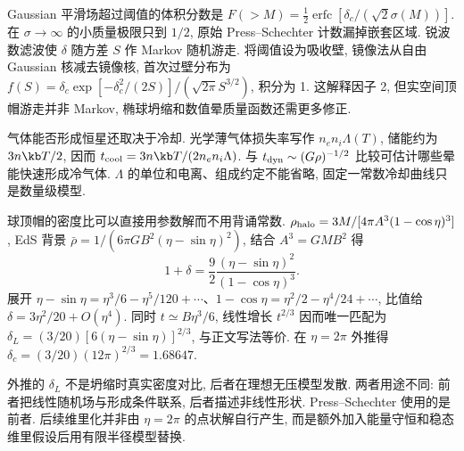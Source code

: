 Gaussian 平滑场超过阈值的体积分数是 $F(>M)=\frac12\operatorname{erfc}[\delta_c/(\sqrt2\sigma(M))]$. 在 $\sigma\to\infty$ 的小质量极限只到 $1/2$, 原始 Press--Schechter 计数漏掉嵌套区域. 锐波数滤波使 $\delta$ 随方差 $S$ 作 Markov 随机游走. 将阈值设为吸收壁, 镜像法从自由 Gaussian 核减去镜像核, 首次过壁分布为 $f(S)=\delta_c\exp[-\delta_c^2/(2S)]/(\sqrt{2\pi}S^{3/2})$, 积分为 1. 这解释因子 2, 但实空间顶帽游走并非 Markov, 椭球坍缩和数值晕质量函数还需更多修正.

气体能否形成恒星还取决于冷却. 光学薄气体损失率写作 $n_en_i\Lambda(T)$, 储能约为 $3n\kb T/2$, 因而 $t_{\rm cool}=3n\kb T/(2n_en_i\Lambda)$. 与 $t_{\rm dyn}\sim(G\rho)^{-1/2}$ 比较可估计哪些晕能快速形成冷气体. $\Lambda$ 的单位和电离、组成约定不能省略, 固定一常数冷却曲线只是数量级模型.

球顶帽的密度比可以直接用参数解而不用背诵常数. $\rho_{\rm halo}=3M/[4\pi A^3(1-\cos\eta)^3]$, EdS 背景 $\bar\rho=1/(6\pi GB^2(\eta-\sin\eta)^2)$, 结合 $A^3=GMB^2$ 得
\[
1+\delta=\frac92\frac{(\eta-\sin\eta)^2}{(1-\cos\eta)^3}.
\]
展开 $\eta-\sin\eta=\eta^3/6-\eta^5/120+\cdots$、$1-\cos\eta=\eta^2/2-\eta^4/24+\cdots$, 比值给 $\delta=3\eta^2/20+O(\eta^4)$. 同时 $t\simeq B\eta^3/6$, 线性增长 $t^{2/3}$ 因而唯一匹配为 $\delta_L=(3/20)[6(\eta-\sin\eta)]^{2/3}$, 与正文写法等价. 在 $\eta=2\pi$ 外推得 $\delta_c=(3/20)(12\pi)^{2/3}=1.68647$.

外推的 $\delta_L$ 不是坍缩时真实密度对比, 后者在理想无压模型发散. 两者用途不同: 前者把线性随机场与形成条件联系, 后者描述非线性形状. Press--Schechter 使用的是前者. 后续维里化并非由 $\eta=2\pi$ 的点状解自行产生, 而是额外加入能量守恒和稳态维里假设后用有限半径模型替换.
